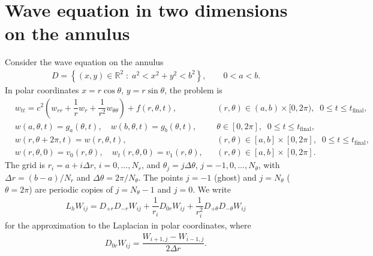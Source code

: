 \documentclass[11pt]{article}
\begin{document}
\section{Wave equation in two dimensions on the annulus}
Consider the wave equation on the annulus
\begin{align}
D=\left\{(x,y)\in \mathbb{R}^2 \;:\; a^2<x^2+y^2<b^2 \right\}, \qquad 0<a<b.
\end{align}
In polar coordinates $x=r\cos\theta$, $y=r\sin\theta$, the problem is
\begin{subequations}
\label{eq:AnnulusWaveEquation}
\begin{align}
&w_{tt}=c^2\left(w_{rr}+\dfrac{1}{r}w_r+\dfrac{1}{r^2}w_{\theta\theta}\right)+f(r,\theta,t), && (r,\theta)\in(a,b)\times [0,2\pi),\;\; 0\leq t\leq t_{\text{final}},\\
&w(a,\theta,t)=g_a(\theta,t), \quad w(b,\theta,t)=g_b(\theta,t), && \theta\in[0,2\pi],\;\; 0\leq t\leq t_{\text{final}},\\
&w(r,\theta+2\pi,t)=w(r,\theta,t), && (r,\theta)\in[a,b]\times [0,2\pi],\;\; 0\leq t\leq t_{\text{final}},\\
&w(r,\theta,0)=v_0(r,\theta), \quad w_t(r,\theta,0)=v_1(r,\theta), && (r,\theta)\in[a,b]\times [0,2\pi].
\end{align}
\end{subequations}
The grid is $r_i = a + i\Delta r$, $i=0,\dots,N_r$, and $\theta_j = j\Delta\theta$, $j=-1,0,\dots,N_\theta$, with $\Delta r=(b-a)/N_r$ and $\Delta\theta = 2\pi/N_\theta$. The points $j=-1$ (ghost) and $j=N_\theta$ ($\theta=2\pi$) are periodic copies of $j=N_\theta-1$ and $j=0$. We write
\begin{align}
L_h W_{ij} = D_{+r}D_{-r}W_{ij}+\dfrac{1}{r_i}D_{0r}W_{ij}+\dfrac{1}{r_i^2}D_{+\theta}D_{-\theta}W_{ij}
\end{align}
for the approximation to the Laplacian in polar coordinates, where
\begin{align*}
D_{0r}W_{ij}=\dfrac{W_{i+1,j}-W_{i-1,j}}{2\Delta r}.
\end{align*}
\end{document}
